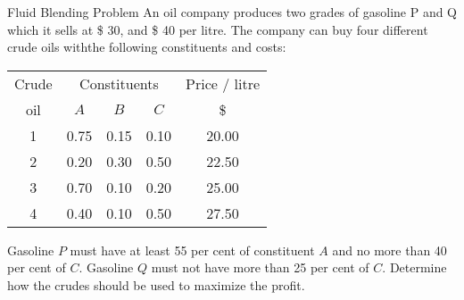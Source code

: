 \begin{frameExample}{Fluid Blending Problem}{}
  An oil company produces two grades of gasoline P and Q which it sells at \$ 30, and \$ 40 per litre. The company can buy four different crude oils withthe following constituents and costs:

  {\centering
    \begin{tabular}{ccccc}
      \toprule
      Crude&\multicolumn{3}{c}{Constituents}& Price / litre\\
      \cmidrule{2-4}
      oil&$A$&$B$&$C$& \$ \\
      \midrule
      1&0.75&0.15&0.10 & 20.00\\
      2&0.20&0.30&0.50&22.50\\
      3&0.70&0.10&0.20&25.00\\
      4&0.40&0.10&0.50&27.50\\
      \bottomrule
    \end{tabular}
    \par}

  Gasoline $P$ must have at least 55 per cent of constituent $A$ and no more than 40 per cent of $C$. Gasoline $Q$ must not have more than 25 per cent of $C$. Determine how the crudes should be used to maximize the profit.
\end{frameExample}


